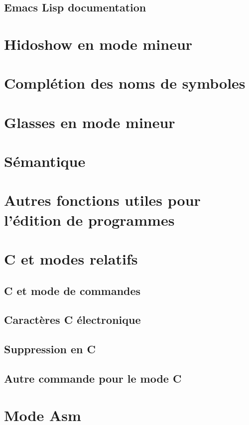 \subsection{Emacs Lisp documentation}\label{chap23sec6subsec3}
\section{Hidoshow en mode mineur}\label{chap23sec7}
\section{Complétion des noms de symboles}\label{chap23sec8}
\section{Glasses en mode mineur}\label{chap23sec9}
\section{Sémantique}\label{chap23sec10}
\section{Autres fonctions utiles pour l'édition de
  programmes}\label{chap23sec10} 
\section{C et modes relatifs}\label{chap23sec11}
\subsection{C et mode de commandes}\label{chap23sec11subsec1}
\subsection{Caractères C électronique}\label{chap23sec11subsec2}
\subsection{Suppression en C}\label{chap23sec11subsec3}
\subsection{Autre commande pour le mode C}\label{chap23sec11subsec4}
\section{Mode Asm}\label{chap23sec12}

